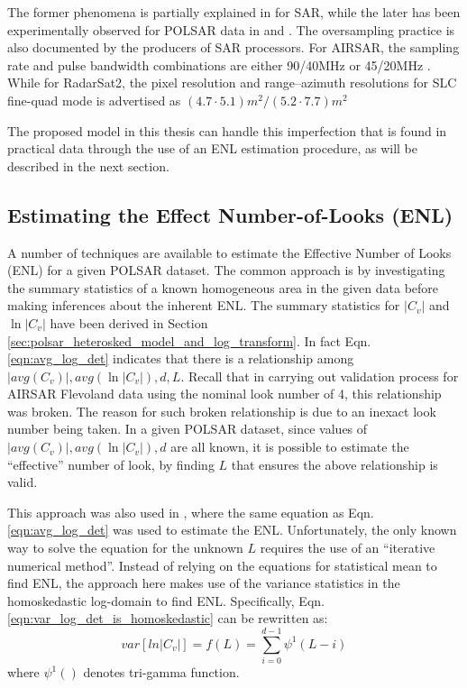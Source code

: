 The former phenomena is partially explained in \cite{Raney_1988_TGRS_666} for SAR,
  while the later has been experimentally observed for POLSAR data in \cite{Lee_1994_TGRS_1017} and \cite{Anfinsen_2009_TGRS_3795}.
The oversampling practice is also documented by the producers of SAR processors.
For AIRSAR, the sampling rate and pulse bandwidth combinations are either 90/40MHz or 45/20MHz \cite{JPL_2013_Web_AIRSAR_Impl}.
While for RadarSat2, the pixel resolution and range--azimuth resolutions for SLC fine-quad mode is advertised as $(4.7 \cdot 5.1)m^2/(5.2 \cdot 7.7)m^2$ \cite{MDA_2013_Web_RadatSat2_Description}


The proposed model in this thesis can handle this imperfection that is found in practical data through the use of an ENL estimation procedure, as will be described in the next section.
  
\subsection{Estimating the Effect Number-of-Looks (ENL)}

A number of techniques are available to estimate the Effective Number of Looks (ENL) for a given POLSAR dataset.
The common approach is by investigating the summary statistics of a known homogeneous area in the given data
  before making inferences about the inherent ENL.
The summary statistics for $|C_v|$ and $\ln|C_v|$ have been derived in Section \ref{sec:polsar_heterosked_model_and_log_transform}.
In fact Eqn. \ref{eqn:avg_log_det} indicates that there is a relationship among $|avg(C_v)|,avg(\ln|C_v|),d,L$.
Recall that in carrying out validation process for AIRSAR Flevoland data using the nominal look number of 4, this relationship was broken.
The reason for such broken relationship is due to an inexact look number being taken.
In a given POLSAR dataset, since values of $|avg(C_v)|,avg(\ln|C_v|),d$ are all known,
  it is possible to estimate the ``effective'' number of look, by finding $L$ that ensures the above relationship is valid.

This approach was also used in \cite{Anfinsen_2009_TGRS_3795}, where the same equation 
  as Eqn.  \ref{eqn:avg_log_det} was used to estimate the ENL.
Unfortunately, the only known way to solve the equation for the unknown $L$ requires the use of an ``iterative numerical method''.
Instead of relying on the equations for statistical mean to find ENL,
  the approach here makes use of the variance statistics in the homoskedastic log-domain to find ENL.
Specifically, Eqn. \ref{eqn:var_log_det_is_homoskedastic} can be rewritten as: 
\begin{equation}
  var \left[ ln|C_v| \right] = f(L) = \sum^{d-1}_{i=0} \psi^1(L-i)
\end{equation}
where $\psi^1()$ denotes tri-gamma function.

